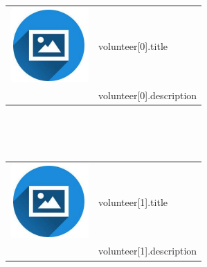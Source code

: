 \documentclass{article}
\begin{document}
\begin{paracol}{2}
\begin{tabular}{@{}ll}
         \begin{minipage}{0.04\linewidth}
         \includegraphics[width=\linewidth]{picon.png}
         \end{minipage} & {volunteer[0].title} \\
         & {volunteer[0].description} \\
\end{tabular}

~

~

\begin{tabular}{@{}ll}
         \begin{minipage}{0.04\linewidth}
         \includegraphics[width=\linewidth]{picon.png}
         \end{minipage} & {volunteer[1].title} \\
         & {volunteer[1].description}
\end{tabular}


\end{paracol}
\end{document}
